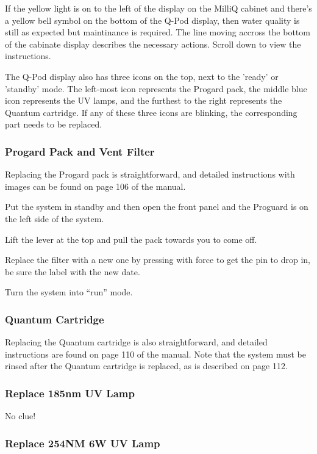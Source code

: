 \documentclass[12pt]{../SOP3_beta}\usepackage[]{graphicx}\usepackage[]{xcolor}
\begin{document}
\NP If the yellow light is on to the left of the display on the MilliQ cabinet and there's a yellow bell symbol on the bottom of the Q-Pod display, then water quality is still as expected but maintinance is required. The line moving accross the bottom of the cabinate display describes the necessary actions. Scroll down to view the instructions. 

\NP The Q-Pod display also has three icons on the top, next to the 'ready' or 'standby' mode. The left-most icon represents the Progard pack, the middle blue icon represents the UV lamps, and the furthest to the right represents the Quantum cartridge. If any of these three icons are blinking, the corresponding part needs to be replaced.

\subsubsection{Progard Pack and Vent Filter}

\NP Replacing the Progard pack is straightforward, and detailed instructions with images can be found on page 106 of the manual.

\NP Put the system in standby and then open the front panel and the Proguard is on the left side of the system.

\NP Lift the lever at the top and pull the pack towards you to come off.

\NP Replace the filter with a new one by pressing with force to get the pin to drop in, be sure the label with the new date.

\NP Turn the system into ``run'' mode. 

\subsubsection{Quantum Cartridge}

\NP Replacing the Quantum cartridge is also straightforward, and detailed instructions are found on page 110 of the manual. Note that the system must be rinsed after the Quantum cartridge is replaced, as is described on page 112. 

\subsubsection{Replace 185nm UV Lamp}

\NP No clue!


\subsubsection{Replace 254NM 6W UV Lamp}
\end{document}
